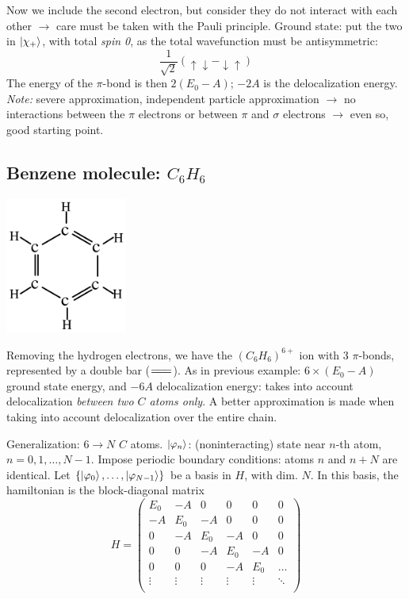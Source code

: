 \documentclass[12pt]{article}
\begin{document}
Now we include the second electron, but consider they
do not interact with each other 
$\to$ care must be taken with the Pauli principle.
Ground state: put the two in $\ket{\chi_{+}}$, with
total \emph{spin 0}, as the total wavefunction
must be antisymmetric:
\[
\frac{1}{\sqrt{2}}
\left(
\uparrow \downarrow-\downarrow \uparrow
\right)
\]
The energy of the $\pi$-bond is then $2(E_0-A)$; 
$-2A$ is the delocalization energy.
\emph{Note:} severe approximation, independent particle
approximation $\to$ no interactions between the
$\pi$ electrons or between $\pi$ and $\sigma$ electrons 
$\to$ even so, good starting point. 


\subsection{Benzene molecule: $C_6H_6$}

\begin{center}
\includegraphics[width=0.3\textwidth]{Figures/benzene.pdf}
\end{center}
Removing the hydrogen electrons, we have the $(C_6H_6)^{6+}$ ion
with 3 $\pi$-bonds, represented by a double bar ($=\joinrel=\joinrel=$).
As in previous example: $6\times(E_0-A)$ ground state energy,
and $-6A$ delocalization energy: takes into account
delocalization \emph{between two $C$ atoms only}.
A better approximation is made when taking into
account delocalization over the entire chain.

Generalization: $6 \to N$ $C$ atoms.
$\ket{\varphi_n}$: (noninteracting) state near $n$-th atom,
$n=0,1,\ldots,N-1$.
Impose periodic boundary conditions: atoms $n$ and $n+N$
are identical. Let
$\{\ket{\varphi_0},\ldots,\ket{\varphi_{N-1}}\}$ be a basis in $H$, with dim. $N$. 
In this basis, the hamiltonian is the block-diagonal matrix
\[
H=
\left(
\begin{array}{rrrrrr}
 E_{0} & -A & 0 & 0 & 0 & 0 \\ 
-A & E_{0} & -A & 0 & 0 & 0 \\ 
0 & -A & E_{0} & -A & 0 & 0 \\ 
0 & 0 & -A & E_{0} & -A & 0 \\ 
0 & 0 & 0 & -A & E_{0} & \ldots \\
\vdots & \vdots & \vdots& \vdots & \vdots & \ddots \\
\end{array}
\right)
\]
\end{document}
